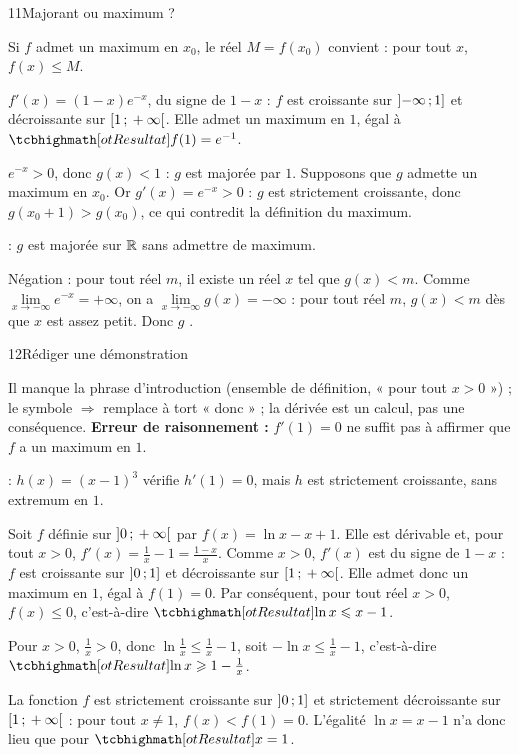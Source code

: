\begin{corrige}{11}{Majorant ou maximum ?}
\begin{questions}
  \item Si $f$ admet un maximum en $x_0$, le réel $M=f(x_0)$ convient : pour tout $x$, $f(x)\leq M$.
  \item $f'(x)=(1-x)e^{-x}$, du signe de $1-x$ : $f$ est croissante sur $\mathopen{]}-\infty\,{;}\,1\mathclose{]}$ et décroissante sur
    $\mathopen{[}1\,{;}\,+\infty\mathclose{[}$. Elle admet un maximum en $1$, égal à $\res{f(1)=e^{-1}}$.
  \item $e^{-x}>0$, donc $g(x)<1$ : $g$ est majorée par $1$. Supposons que $g$ admette un maximum en $x_0$. Or
    $g'(x)=e^{-x}>0$ : $g$ est strictement croissante, donc $g(x_0+1)>g(x_0)$, ce qui contredit la définition du maximum.
  \item {} : $g$ est majorée sur $\mathbb{R}$ sans admettre de maximum.
  \item Négation : pour tout réel $m$, il existe un réel $x$ tel que $g(x)<m$. Comme $\lim\limits_{x\to-\infty}e^{-x}=+\infty$,
    on a $\lim\limits_{x\to-\infty}g(x)=-\infty$ : pour tout réel $m$, $g(x)<m$ dès que $x$ est assez petit. Donc $g$
    .
\end{questions}
\end{corrige}

\begin{corrige}{12}{Rédiger une démonstration}
\begin{questions}
  \item Il manque la phrase d'introduction (ensemble de définition, « pour tout $x>0$ ») ; le symbole $\Rightarrow$ remplace à tort
    « donc » ; la dérivée est un calcul, pas une conséquence. \textbf{Erreur de raisonnement :} $f'(1)=0$ ne suffit pas à
    affirmer que $f$ a un maximum en $1$.
  \item {} : $h(x)=(x-1)^{3}$ vérifie $h'(1)=0$, mais $h$ est strictement croissante, sans extremum en $1$.
  \item Soit $f$ définie sur $\mathopen{]}0\,{;}\,+\infty\mathclose{[}$ par $f(x)=\ln x-x+1$. Elle est dérivable et, pour tout $x>0$,
    $f'(x)=\frac1x-1=\frac{1-x}{x}$. Comme $x>0$, $f'(x)$ est du signe de $1-x$ : $f$ est croissante sur $\mathopen{]}0\,{;}\,1\mathclose{]}$ et
    décroissante sur $\mathopen{[}1\,{;}\,+\infty\mathclose{[}$. Elle admet donc un maximum en $1$, égal à $f(1)=0$. Par conséquent, pour tout réel
    $x>0$, $f(x)\leq0$, c'est-à-dire $\res{\ln x\leq x-1}$.
\end{questions}
\begin{questions}[resume]
  \item Pour $x>0$, $\frac1x>0$, donc $\ln\frac1x\leq\frac1x-1$, soit $-\ln x\leq\frac1x-1$, c'est-à-dire
    $\res{\ln x\geq1-\frac1x}$.
  \item La fonction $f$ est strictement croissante sur $\mathopen{]}0\,{;}\,1\mathclose{]}$ et strictement décroissante sur $\mathopen{[}1\,{;}\,+\infty\mathclose{[}$ : pour
    tout $x\neq1$, $f(x)<f(1)=0$. L'égalité $\ln x=x-1$ n'a donc lieu que pour $\res{x=1}$.
\end{questions}
\end{corrige}
